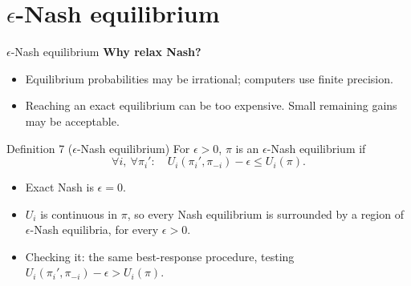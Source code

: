 \documentclass[aspectratio=169,11pt]{beamer}
\begin{document}
\section{$\epsilon$-Nash equilibrium}

\begin{frame}{$\epsilon$-Nash equilibrium}
  \textbf{Why relax Nash?}
  \begin{itemize}
    \item Equilibrium probabilities may be irrational; computers use finite precision.
    \item Reaching an exact equilibrium can be too expensive. Small remaining gains may be acceptable.
  \end{itemize}
  \begin{block}{Definition 7 ($\epsilon$-Nash equilibrium)}
    For $\epsilon > 0$, $\pi$ is an $\epsilon$-Nash equilibrium if
    \[
      \forall i,\ \forall \pi_i' : \quad U_i(\pi_i', \pi_{-i}) - \epsilon \le U_i(\pi).
    \]
  \end{block}
  \begin{itemize}
    \item Exact Nash is $\epsilon = 0$.
    \item $U_i$ is continuous in $\pi$, so every Nash equilibrium is surrounded by a region of $\epsilon$-Nash equilibria, for every $\epsilon > 0$.
    \item Checking it: the same best-response procedure, testing $U_i(\pi_i', \pi_{-i}) - \epsilon > U_i(\pi)$.
  \end{itemize}
\end{frame}
\end{document}
